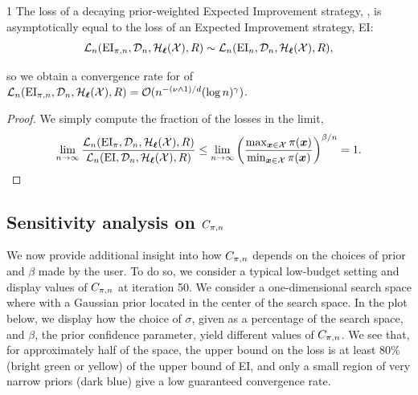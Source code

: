 \begin{customcorl}{1}\label{corollaryone}
The loss of a decaying prior-weighted Expected Improvement strategy, \pei{}, is asymptotically equal to the loss of an Expected Improvement strategy, EI:
\begin{equation}
    \mathcal{L}_{n}(\text{EI}_{{\pi}, n}, \mathcal{D}_n, \mathcal{H}_{\bm{\ell}}(\mathcal{X}), R) \sim  \mathcal{L}_{n}(\text{EI}_n, \mathcal{D}_n, \mathcal{H}_{\bm{\ell}}(\mathcal{X}), R),
\end{equation}

so we obtain a convergence rate for \pei{} of $\mathcal{L}_{n}(\text{EI}_{{\pi}, n}, \mathcal{D}_n, \mathcal{H}_{\bm{\ell}}(\mathcal{X}), R) = \mathcal{O}(n^{-(\nu \land 1)/d}(\log n)^\gamma)$.
\end{customcorl}

\begin{proof}
We simply compute the fraction of the losses in the limit,
\begin{equation}
    \lim_{n \to \infty}\frac{\mathcal{L}_n(\text{EI}_\pi, \mathcal{D}_n, \mathcal{H}_{\bm{\ell}}(\mathcal{X}), R)}{\mathcal{L}_n(\text{EI}, \mathcal{D}_n, \mathcal{H}_{\bm{\ell}}(\mathcal{X}), R)} \le \lim_{n \to \infty} \left(\frac{\max_{\bm{x}\in\mathcal{X}}{\pi}(\bm{x})}{\min_{\bm{x}\in\mathcal{X}}{\pi}(\bm{x})}\right)^{\beta/n} =1.
\end{equation}
\end{proof}

\subsection{Sensitivity analysis on $C_{{\pi}, n}$}
We now provide additional insight into how $C_{{\pi}, n}$ depends on the choices of prior and $\beta$ made by the user. To do so, we consider a typical low-budget setting and display values of $C_{{\pi}, n}$ at iteration 50. We consider a one-dimensional search space where with a Gaussian prior located in the center of the search space. In the plot below, we display how the choice of $\sigma$, given as a percentage of the search space, and $\beta$, the prior confidence parameter, yield different values of $C_{{\pi}, n}$. We see that, for approximately half of the space, the upper bound on the loss is at least 80\% (bright green or yellow) of the upper bound of EI, and only a small region of very narrow priors (dark blue) give a low guaranteed convergence rate.

